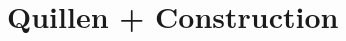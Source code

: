 \documentclass[12pt]{report}
\numberwithin{equation}{section}
\newtheorem{theorem}[dummy]{Theorem}
\newtheorem{definition}[dummy]{Definition}
\newtheorem{proposition}[dummy]{Proposition}
\begin{document}
%	
%	
%	
%	
%	
%	
%	
%	
%	
%	
	
	
	\chapter{Quillen + Construction}
\end{document}
